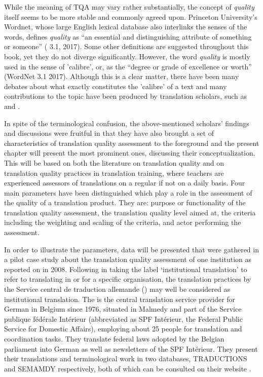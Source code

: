 \documentclass[output=paper]{langsci/langscibook}
\begin{document}
While the meaning of TQA may vary rather substantially, the concept of \textit{quality} itself seems to be more stable and commonly agreed upon. Princeton University's Wordnet, whose large English lexical database also interlinks the senses of the words, defines \textit{quality} as ``an essential and distinguishing attribute of something or someone'' (\citeauthor{WordNet2010} 3.1, 2017). Some other definitions are suggested throughout this book, yet they do not diverge significantly. However, the word \textit{quality} is mostly used in the sense of 'calibre', or, as the ``degree or grade of excellence or worth'' (WordNet 3.1 2017). Although this is a clear matter, there have been many debates about what exactly constitutes the 'calibre' of a text and many contributions to the topic have been produced by translation scholars, such as \citet{Lauscher2000,Maier2000,Lee-Jahnke2001,Colina2009,VanPoel2007} and \citet{Depraetere2011}. 

In spite of the terminological confusion, the above-mentioned scholars' findings and discussions were fruitful in that they have also brought a set of characteristics of translation quality assessment to the foreground and the present chapter will present the most prominent ones, discussing their conceptualization. This will be based on both the literature on translation quality and on translation quality practices in translation training, where teachers are experienced assessors of translations on a regular if not on a daily basis. Four main parameters have been distinguished which play a role in the assessment of the quality of a translation product. They are: purpose or functionality of the translation quality assessment, the translation quality level aimed at, the criteria including the weighting and scaling of the criteria, and actor performing the assessment. 

In order to illustrate the parameters, data will be presented that were gathered in a pilot case study about the translation quality assessment of one institution as reported on in 2008. Following \citet[493–494]{Schäffner2014} in taking the label ‘institutional translation’ to refer to translating in or for a specific organisation, the translation practices by the Service central de traduction allemande (\citeauthor{SCTAn.d.}) may well be considered as institutional translation. The \citeauthor{SCTA2015} is the central translation service provider for German in Belgium since 1976, situated in Malmedy and part of the Service publique fédérale Intérieur (abbreviated as SPF Intérieur, the Federal Public Service for Domestic Affairs), employing about 25 people for translation and coordination tasks. They translate federal laws adopted by the Belgian parliament into German as well as newsletters of the SPF Intérieur. They present their translations and terminological work in two databases, TRADUCTIONS and SEMAMDY respectively, both of which can be consulted on their website \citep{SCTAn.d.}.
\end{document}
